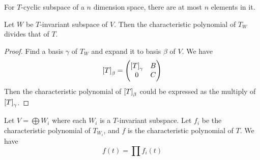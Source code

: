 For $T$-cyclic subspace of a $n$ dimension space, there are at most $n$ elements in it. 

\begin{theorem}\label{split_of_invariant_subspace}
    Let $W$ be $T$-invariant subspace of $V$. Then the characteristic polynomial of $T_W$ divides that of $T$.    
\end{theorem}
\begin{proof}
    Find a basis $\gamma$ of $T_W$ and expand it to basis $\beta$ of $V$. We have 
    \begin{equation*}
        \coordinate{T}_\beta = \begin{pmatrix}
            \coordinate{T}_\gamma & B \\
            0 & C        
        \end{pmatrix}
    \end{equation*}
    Then the characteristic polynomial of $\coordinate{T}_\beta$ could be expressed as the multiply of $\coordinate{T}_\gamma$.
\end{proof}

\begin{theorem}
    Let $V = \bigoplus W_i$ where each $W_i$ is a $T$-invariant subspace. Let $f_i$ be the characteristic polynomial of $T_{W_i}$, and $f$ is the characteristic polynomial of $T$. We have 
    \begin{equation}
        f(t) = \prod f_i (t)
    \end{equation}
\end{theorem}



